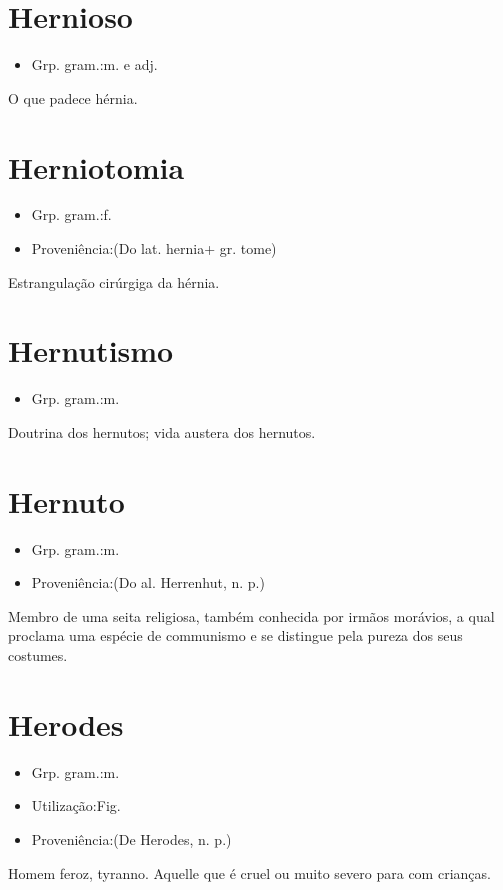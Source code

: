 \documentclass{article}
\begin{document}
\section{Hernioso}
\begin{itemize}
\item {Grp. gram.:m.  e  adj.}
\end{itemize}
O que padece hérnia.
\section{Herniotomia}
\begin{itemize}
\item {Grp. gram.:f.}
\end{itemize}
\begin{itemize}
\item {Proveniência:(Do lat. \textunderscore hernia\textunderscore  + gr. \textunderscore tome\textunderscore )}
\end{itemize}
Estrangulação cirúrgiga da hérnia.
\section{Hernutismo}
\begin{itemize}
\item {Grp. gram.:m.}
\end{itemize}
Doutrina dos hernutos; vida austera dos hernutos.
\section{Hernuto}
\begin{itemize}
\item {Grp. gram.:m.}
\end{itemize}
\begin{itemize}
\item {Proveniência:(Do al. \textunderscore Herrenhut\textunderscore , n. p.)}
\end{itemize}
Membro de uma seita religiosa, também conhecida por \textunderscore irmãos morávios\textunderscore , a qual proclama uma espécie de communismo e se distingue pela pureza dos seus costumes.
\section{Herodes}
\begin{itemize}
\item {Grp. gram.:m.}
\end{itemize}
\begin{itemize}
\item {Utilização:Fig.}
\end{itemize}
\begin{itemize}
\item {Proveniência:(De \textunderscore Herodes\textunderscore , n. p.)}
\end{itemize}
Homem feroz, tyranno.
Aquelle que é cruel ou muito severo para com crianças.
\end{document}
